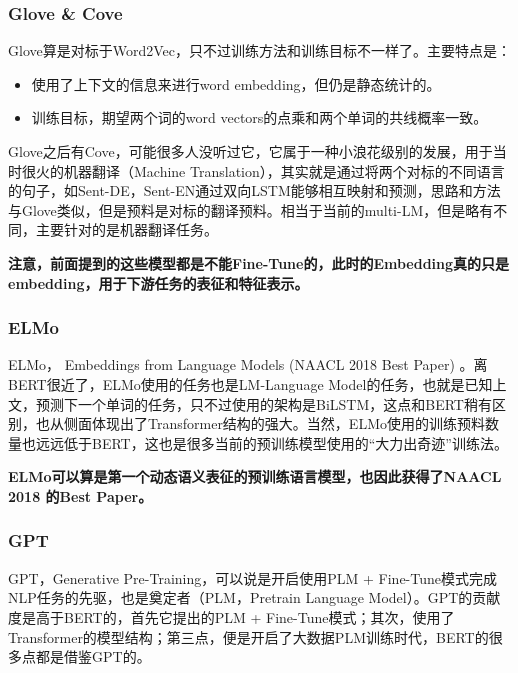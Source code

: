 \documentclass{article} %
\begin{document}
\subsubsection{Glove \& Cove}
Glove算是对标于Word2Vec，只不过训练方法和训练目标不一样了。主要特点是：

\begin{itemize}
    \item 使用了上下文的信息来进行word embedding，但仍是静态统计的。
    \item 训练目标，期望两个词的word vectors的点乘和两个单词的共线概率一致。
\end{itemize}

Glove之后有Cove，可能很多人没听过它，它属于一种小浪花级别的发展，用于当时很火的机器翻译（Machine Translation），其实就是通过将两个对标的不同语言的句子，如Sent-DE，Sent-EN通过双向LSTM能够相互映射和预测，思路和方法与Glove类似，但是预料是对标的翻译预料。相当于当前的multi-LM，但是略有不同，主要针对的是机器翻译任务。

\textbf{注意，前面提到的这些模型都是不能Fine-Tune的，此时的Embedding真的只是embedding，用于下游任务的表征和特征表示。}

\subsubsection{ELMo}
ELMo， Embeddings from Language Models (NAACL 2018 Best Paper) 。离BERT很近了，ELMo使用的任务也是LM-Language Model的任务，也就是已知上文，预测下一个单词的任务，只不过使用的架构是BiLSTM，这点和BERT稍有区别，也从侧面体现出了Transformer结构的强大。当然，ELMo使用的训练预料数量也远远低于BERT，这也是很多当前的预训练模型使用的“大力出奇迹”训练法。

\textbf{ELMo可以算是第一个动态语义表征的预训练语言模型，也因此获得了NAACL 2018 的Best Paper。}

\subsubsection{GPT}
GPT，Generative Pre-Training，可以说是开启使用PLM + Fine-Tune模式完成NLP任务的先驱，也是奠定者（PLM，Pretrain Language Model）。GPT的贡献度是高于BERT的，首先它提出的PLM + Fine-Tune模式；其次，使用了Transformer的模型结构；第三点，便是开启了大数据PLM训练时代，BERT的很多点都是借鉴GPT的。
\end{document}
